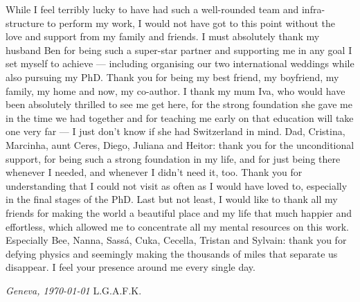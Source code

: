 While I feel terribly lucky to have had such a well-rounded team and infra-structure to perform my work, I would not have got to this point without the love and support from my family and friends. I must absolutely thank my husband Ben for being such a super-star partner and supporting me in any goal I set myself to achieve --- including organising our two international weddings while also pursuing my PhD. Thank you for being my best friend, my boyfriend, my family, my home and now, my co-author. I thank my mum Iva, who would have been absolutely thrilled to see me get here, for the strong foundation she gave me in the time we had together and for teaching me early on that education will take one very far --- I just don't know if she had Switzerland in mind. Dad, Cristina, Marcinha, aunt Ceres, Diego, Juliana and Heitor: thank you for the unconditional support, for being such a strong foundation in my life, and for just being there whenever I needed, and whenever I didn't need it, too. Thank you for understanding that I could not visit as often as I would have loved to, especially in the final stages of the PhD. Last but not least, I would like to thank all my friends for making the world a beautiful place and my life that much happier and effortless, which allowed me to concentrate all my mental resources on this work. Especially Bee, Nanna, Sassá, Cuka, Cecella, Tristan and Sylvain: thank you for defying physics and seemingly making the thousands of miles that separate us disappear. I feel your presence around me every single day.

\vspace{1cm}


 
\noindent\textit{Geneva, \today}
\hfill L.G.A.F.K.
